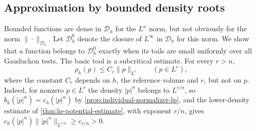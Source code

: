 \subsection{Approximation by bounded density roots}\label{subsec:bounded-root-approximation}

Bounded functions are dense in $\mathcal D_h$ for the $L^n$ norm, but not obviously for the norm $\|\cdot\|_{\mathcal D_h}$. Let $\mathcal D_h^0$ denote the closure of $L^\infty$ in $\mathcal D_h$ for this norm. We show that a function belongs to $\mathcal D_h^0$ exactly when its tails are small uniformly over all Gauduchon tests. The basic tool is a subcritical estimate. For every $r>n$,
\begin{equation}\label{eq:root-subcritical-bound}
 \rho_h(p)\leq C_r\|p\|_{L^r}\qquad(p\in L^r),
\end{equation}
where the constant $C_r$ depends on $h$, the reference volume and $r$, but not on $p$. Indeed, for nonzero $p\in L^r$ the density $|p|^n$ belongs to $L^{r/n}$, so $b_h(|p|^n)=c_h(|p|^n)$ by \cref{prop:individual-normalizer-lp}, and the lower-density estimate of \cref{thm:lp-potential-estimate}, with exponent $r/n$, gives $c_h(|p|^n)\||p|^n\|_{L^{r/n}}\geq c_{r/n}>0$.

